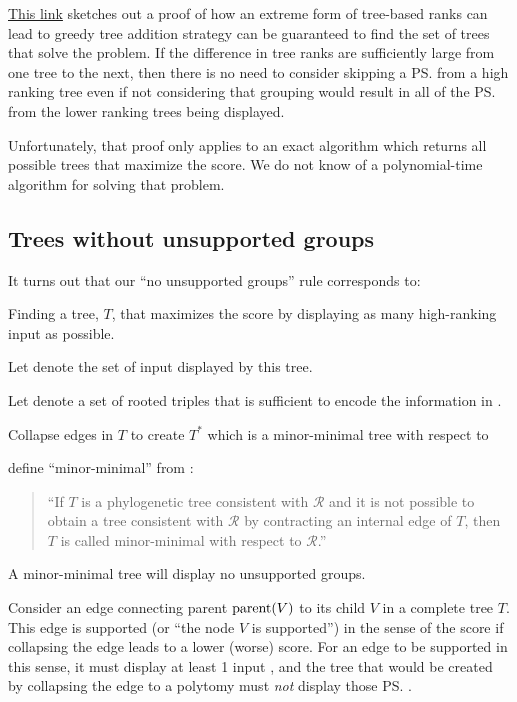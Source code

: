 \documentclass[11pt]{article}
\begin{document}
\href{https://github.com/OpenTreeOfLife/treemachine/wiki/MaxWeightOfInputTreeEdgesDisplayed}{This link}
    sketches out a proof of how an extreme form of tree-based ranks
    can lead to greedy tree addition strategy can be guaranteed to 
    find the set of trees that solve the \MSWIPSD problem.
If the difference in tree ranks are sufficiently large from one tree to the next,
    then there is no need to consider skipping a \ps from a high ranking tree
    even if not considering that grouping would result in all of the \ps
    from the lower ranking trees being displayed.

Unfortunately, that proof only applies to an exact algorithm which returns
    all possible trees that maximize the score.
We do not know of a polynomial-time algorithm for solving that problem.

\subsection{Trees without unsupported groups}\label{unsupportedTheory}
It turns out that our ``no unsupported groups'' rule corresponds to:
\begin{compactenum}
    \item Finding a tree, $T$, that maximizes the score by displaying as many high-ranking input \pss as possible.
    \item Let \pssInOptimalTree denote the set of input \pss displayed by this tree.
    \item Let \tripleSetInOptimal denote a set of rooted triples that is sufficient to encode the information in \pssInOptimalTree.
    \item Collapse edges in $T$ to create $T^{\ast}$ which is a minor-minimal tree with respect to \tripleSetInOptimal
\end{compactenum}
\citet{JanssonLL2012} define ``minor-minimal'' from \citet{Semple2003}:
\begin{quote}
``If $T$ is a phylogenetic tree consistent with $\mathcal{R}$ and it is not possible to obtain a tree consistent with $\mathcal{R}$ by contracting an internal edge of $T$, then $T$ is called minor-minimal with respect to $\mathcal{R}$.''
\end{quote}
A minor-minimal tree will display no unsupported groups.


Consider an edge connecting parent $\mbox{parent}(V)$ to its child $V$ in a complete tree $T$.
This edge is supported (or ``the node $V$ is supported'') in the sense of the \MSWIPSD score if
    collapsing the edge leads to a lower (worse) score.
For an edge to be supported in this sense, it must display at least 1 input \pss, and
    the tree that would be created by collapsing the edge to a polytomy must
    {\em not} display those \ps.
\end{document}
